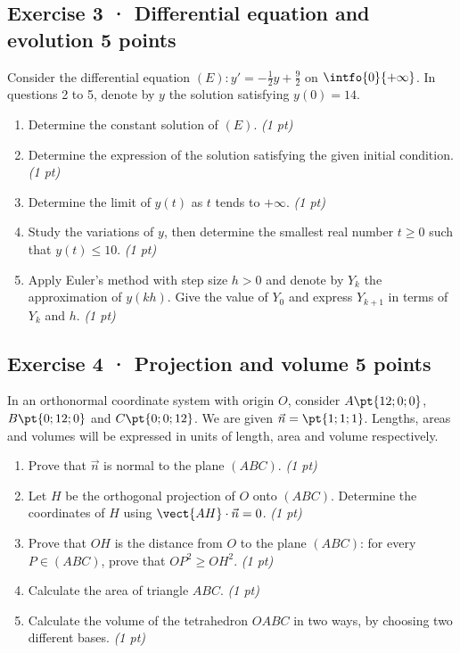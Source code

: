 \mxnewpage{}

\subsection*{Exercise 3 · Differential equation and evolution \hfill 5 points}Consider the differential equation $(E):y'=-\frac1{2}y+\frac{9}{2}$ on $\intfo{0}{+\infty}$. In questions 2 to 5, denote by $y$ the solution satisfying $y(0)=14$.

\begin{enumerate}

\item Determine the constant solution of $(E)$. \hfill\textit{(1 pt)}

\item Determine the expression of the solution satisfying the given initial condition. \hfill\textit{(1 pt)}

\item Determine the limit of $y(t)$ as $t$ tends to $+\infty$. \hfill\textit{(1 pt)}

\item Study the variations of $y$, then determine the smallest real number $t\ge0$ such that $y(t)\le10$. \hfill\textit{(1 pt)}

\item Apply Euler's method with step size $h>0$ and denote by $Y_k$ the approximation of $y(kh)$. Give the value of $Y_0$ and express $Y_{k+1}$ in terms of $Y_k$ and $h$. \hfill\textit{(1 pt)}

\end{enumerate}

\subsection*{Exercise 4 · Projection and volume \hfill 5 points}In an orthonormal coordinate system with origin $O$, consider $A\pt{12;0;0}$, $B\pt{0;12;0}$ and $C\pt{0;0;12}$. We are given $\vec n=\pt{1;1;1}$. Lengths, areas and volumes will be expressed in units of length, area and volume respectively.

\begin{enumerate}

\item Prove that $\vec n$ is normal to the plane $(ABC)$. \hfill\textit{(1 pt)}

\item Let $H$ be the orthogonal projection of $O$ onto $(ABC)$. Determine the coordinates of $H$ using $\vect{AH}\cdot\vec n=0$. \hfill\textit{(1 pt)}

\item Prove that $OH$ is the distance from $O$ to the plane $(ABC)$: for every $P\in(ABC)$, prove that $OP^2\ge OH^2$. \hfill\textit{(1 pt)}

\item Calculate the area of triangle $ABC$. \hfill\textit{(1 pt)}

\item Calculate the volume of the tetrahedron $OABC$ in two ways, by choosing two different bases. \hfill\textit{(1 pt)}

\end{enumerate}

